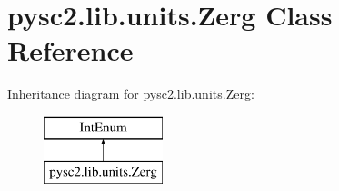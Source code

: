 \hypertarget{classpysc2_1_1lib_1_1units_1_1_zerg}{}\section{pysc2.\+lib.\+units.\+Zerg Class Reference}
\label{classpysc2_1_1lib_1_1units_1_1_zerg}
Inheritance diagram for pysc2.\+lib.\+units.\+Zerg\+:\begin{figure}[H]
\begin{center}
\leavevmode
\includegraphics[height=2.000000cm]{classpysc2_1_1lib_1_1units_1_1_zerg}
\end{center}
\end{figure}
